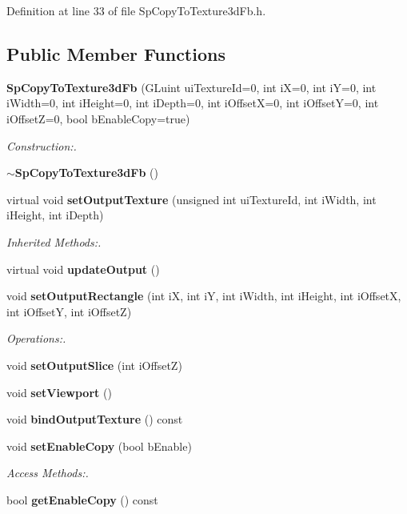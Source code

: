 Definition at line 33 of file Sp\-Copy\-To\-Texture3d\-Fb.h.\subsection*{Public Member Functions}
\begin{CompactItemize}
\item 
{\bf Sp\-Copy\-To\-Texture3d\-Fb} (GLuint ui\-Texture\-Id=0, int i\-X=0, int i\-Y=0, int i\-Width=0, int i\-Height=0, int i\-Depth=0, int i\-Offset\-X=0, int i\-Offset\-Y=0, int i\-Offset\-Z=0, bool b\-Enable\-Copy=true)
\begin{CompactList}\small\item\em Construction:. \item\end{CompactList}\item 
{\bf $\sim$Sp\-Copy\-To\-Texture3d\-Fb} ()
\item 
virtual void {\bf set\-Output\-Texture} (unsigned int ui\-Texture\-Id, int i\-Width, int i\-Height, int i\-Depth)
\begin{CompactList}\small\item\em Inherited Methods:. \item\end{CompactList}\item 
virtual void {\bf update\-Output} ()
\item 
void {\bf set\-Output\-Rectangle} (int i\-X, int i\-Y, int i\-Width, int i\-Height, int i\-Offset\-X, int i\-Offset\-Y, int i\-Offset\-Z)
\begin{CompactList}\small\item\em Operations:. \item\end{CompactList}\item 
void {\bf set\-Output\-Slice} (int i\-Offset\-Z)
\item 
void {\bf set\-Viewport} ()
\item 
void {\bf bind\-Output\-Texture} () const
\item 
void {\bf set\-Enable\-Copy} (bool b\-Enable)
\begin{CompactList}\small\item\em Access Methods:. \item\end{CompactList}\item 
bool {\bf get\-Enable\-Copy} () const
\end{CompactItemize}
